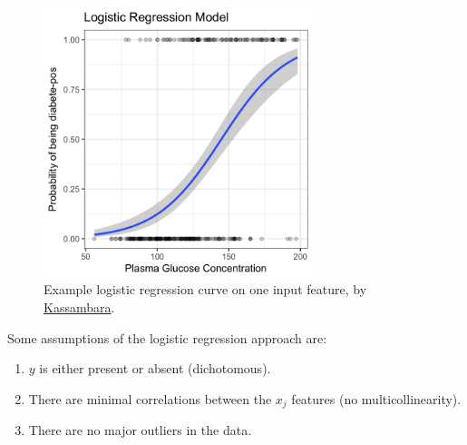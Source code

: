\begin{figure}
\centering
\includegraphics[width=0.7\textwidth]{figures/regression/logistic-regression-probabilities-curve.png}
\caption{
Example logistic regression curve on one input feature, by \href{http://www.sthda.com/english/articles/36-classification-methods-essentials/151-logistic-regression-essentials-in-r/}{Kassambara}.
}
\label{fig:logistic_regression_ex}
\end{figure}

Some assumptions of the logistic regression approach are:
\begin{enumerate}[noitemsep]
\item $y$ is either present or absent (dichotomous).
\item There are minimal correlations between the $x_{j}$ features (no multicollinearity).
\item There are no major outliers in the data.
\end{enumerate}

